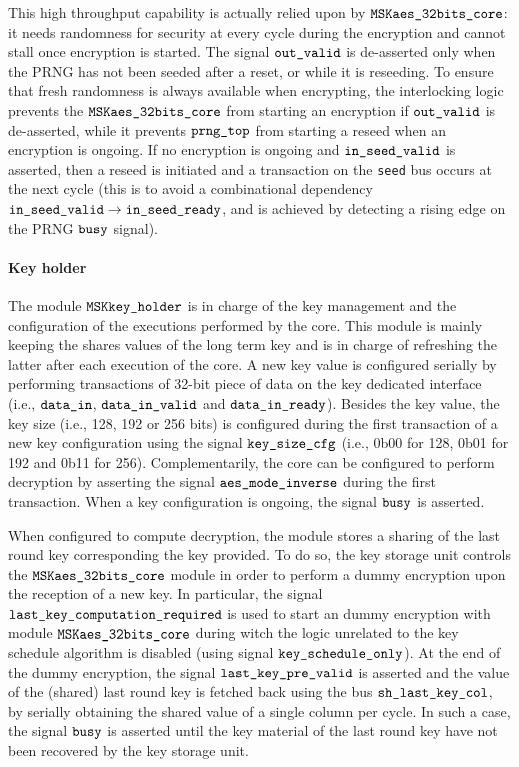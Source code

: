 \documentclass{scrartcl}
\begin{document}
This high throughput capability is actually relied upon by $\texttt{MSKaes\_32bits\_core}$: it
needs randomness for security at every cycle during the encryption
and cannot stall once encryption is started.
The signal $\texttt{out\_valid}$ is de-asserted only when the PRNG has not been
seeded after a reset, or while it is reseeding.
To ensure that fresh randomness is always available when encrypting, the
interlocking logic prevents the $\texttt{MSKaes\_32bits\_core}$ from starting an encryption if
$\texttt{out\_valid}$ is de-asserted, while it prevents $\texttt{prng\_top}$ from
starting a reseed when an encryption is ongoing.
If no encryption is ongoing and $\texttt{in\_seed\_valid}$ is asserted, then a reseed is
initiated and a transaction on the \texttt{seed} bus occurs at the next cycle
(this is to avoid a combinational dependency $\texttt{in\_seed\_valid} \rightarrow
\texttt{in\_seed\_ready}$, and is achieved by detecting a rising edge on the PRNG
$\texttt{busy}$ signal).

\paragraph{Key holder}
The module $\texttt{MSKkey\_holder}$ is in charge of the key management and the
configuration of the executions performed by the core. This module is mainly
keeping the shares values of the long term key and is in charge of refreshing
the latter after each execution of the core. A new key value is configured
serially by performing transactions of 32-bit piece of data on the key
dedicated interface (i.e., $\texttt{data\_in}$, $\texttt{data\_in\_valid}$ and
$\texttt{data\_in\_ready}$). Besides the key value, the key size (i.e., 128, 192 or
256 bits) is configured during the first transaction of a new key configuration
using the signal $\texttt{key\_size\_cfg}$ (i.e., 0b00 for 128, 0b01 for 192 and 0b11
for 256). Complementarily, the core can be configured to perform decryption by
asserting the signal $\texttt{aes\_mode\_inverse}$ during the first transaction. When a key
configuration is ongoing, the signal $\texttt{busy}$ is asserted. 

When configured to compute decryption, the module stores a sharing of the last
round key corresponding the key provided. To do so, the key storage unit
controls the $\texttt{MSKaes\_32bits\_core}$ module in order to perform a dummy encryption upon
the reception of a new key. In particular, the signal $\texttt{last\_key\_computation\_required}$ is
used to start an dummy encryption with module $\texttt{MSKaes\_32bits\_core}$ during witch the
logic unrelated to the key schedule algorithm is disabled (using signal
$\texttt{key\_schedule\_only}$). At the end of the dummy encryption, the signal
$\texttt{last\_key\_pre\_valid}$ is asserted and the value of the (shared) last
round key is fetched back using the bus $\texttt{sh\_last\_key\_col}$, by serially
obtaining the shared value of a single column per cycle. In such a case, the
signal $\texttt{busy}$ is asserted until the key material of the last round key
have not been recovered by the key storage unit. 
\end{document}
